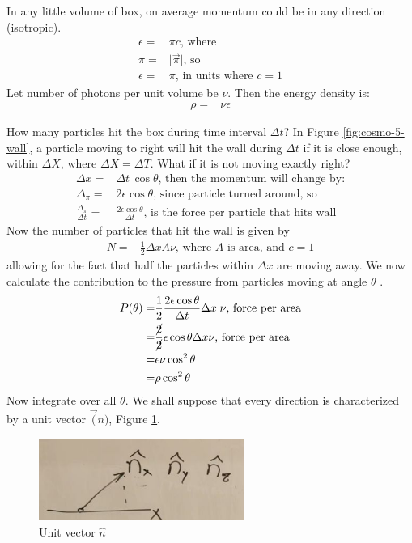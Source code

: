 \documentclass[]{article}
\begin{document}
In any little volume of box, on average momentum could be in any direction (isotropic).
\begin{align*}
	\epsilon =&  \pi c \text{, where }\\
	\pi=&\lvert\vec{\pi}\rvert \text{, so}\\
	\epsilon =& \pi \text{, in units where $c=1$}
\end{align*}
Let number of photons per unit volume be $\nu$. Then the energy density is:
\begin{align*}
	\rho =& \nu \epsilon 
\end{align*}

How many particles hit the box during time interval $\Delta t$? In Figure \ref{fig:cosmo-5-wall}, a particle moving to right will hit the wall during $\Delta t$ if it is close enough, within $\Delta X$, where $\Delta X=\Delta T$. What if it is not moving exactly right?
\begin{align*}
	\Delta x =& \Delta t \, \cos{\theta} \text{, then the momentum will change by:}\\
	\Delta_{\pi} =& 2 \epsilon \cos {\theta} \text{, since particle turned around, so}\\
	\frac{\Delta_{\pi}}{\Delta t} =& \frac{2 \epsilon \cos {\theta}}{\Delta t} \text{, is the force per particle that hits wall}
\end{align*}
Now the number of particles that hit the wall is given by
\begin{align*}
	N =& \frac{1}{2}\Delta x A \nu \text{, where $A$ is area, and $c=1$}
\end{align*}
allowing for the fact that half the particles within $\Delta x$ are moving away. We now calculate the contribution to the pressure from particles moving at angle $\theta$
.\begin{align*}
	P(\theta) =& \frac{1}{2} \frac{2 \epsilon \cos {\theta}}{\Delta t} \Delta x  \; \nu \text{, force per area}\\
	=& \frac{\cancel{2}}{\cancel{2}}  \epsilon \cos {\theta} \Delta x  \nu \text{, force per area}\\
	=&  \epsilon \nu \cos^2 {\theta}  \\ 
	=& \rho  \cos^2 {\theta} 
\end{align*}
Now integrate over all $\theta$. We shall suppose that every direction is characterized by a unit vector $\vec(n)$, Figure \ref{fig:cosmo-5-nxnynz}.

\begin{figure}[H]
	\caption{Unit vector $\hat{n}$}\label{fig:cosmo-5-nxnynz}
	\begin{center}
		\includegraphics[width=0.6\textwidth]{cosmo-5-nxnynz}
	\end{center}
\end{figure}
\end{document}
